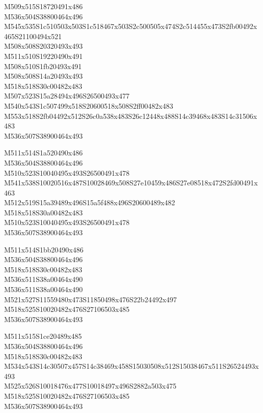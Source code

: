 \documentclass{article}
\begin{document}
\begin{multicols}{5}
\begin{center}

M509x515S18720491x486 %
\\M536x504S38800464x496 %
\\M545x535S1c510503x503S1c518467x503S2c500505x474S2c514455x473S2fb00492x465S21100494x521 %
\\M508x508S20320493x493 %
\\M511x510S19220490x491 %
\\M508x510S1fb20493x491 %
\\M508x508S14a20493x493 %
\\M518x518S30c00482x483 %
\\M507x523S15a28494x496S26500493x477 %
\\M540x543S1c507499x518S20600518x508S2ff00482x483 %
\\M553x518S2fb04492x512S26c0a538x483S26c12448x488S14c39468x483S14c31506x483 %
\\M536x507S38900464x493 %
\vfil
\columnbreak

M511x514S1a520490x486 %
\\M536x504S38800464x496 %
\\M510x523S10040495x493S26500491x478 %
\\M541x538S10020516x487S10028469x508S27e10459x486S27e08518x472S2fd00491x463 %
\\M512x519S15a39489x496S15a5f488x496S20600489x482 %
\\M518x518S30a00482x483 %
\\M510x523S10040495x493S26500491x478 %
\\M536x507S38900464x493 %
\vfil
\columnbreak

M511x514S1bb20490x486 %
\\M536x504S38800464x496 %
\\M518x518S30c00482x483 %
\\M536x511S38a00464x490 %
\\M536x511S38a00464x490 %
\\M521x527S11559480x473S11850498x476S22b24492x497 %
\\M518x525S10020482x476S27106503x485 %
\\M536x507S38900464x493 %
\vfil
\columnbreak

M511x515S1ce20489x485 %
\\M536x504S38800464x496 %
\\M518x518S30c00482x483 %
\\M534x543S14c30507x457S14c38469x458S15030508x512S15038467x511S26524493x493 %
\\M525x526S10018476x477S10018497x496S2882a503x475 %
\\M518x525S10020482x476S27106503x485 %
\\M536x507S38900464x493 %
\vfil
\columnbreak


\end{center}
\end{multicols}
\end{document}
